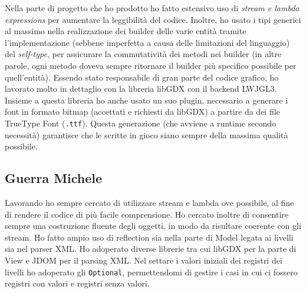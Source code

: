 Nella parte di progetto che ho prodotto ho fatto estensivo uso di \emph{stream
e lambda expressions} per aumentare la leggibilità del codice. Inoltre, ho
usato i tipi generici al massimo nella realizzazione dei builder delle varie
entità tramite l'implementazione (sebbene imperfetta a causa delle limitazioni
del linguaggio) del \emph{self-type}, per assicurare la commutatività dei
metodi nei builder (in altre parole, ogni metodo doveva sempre ritornare il
builder più specifico possibile per quell'entità). Essendo stato responsabile
di gran parte del codice grafico, ho lavorato molto in dettaglio con la
libreria libGDX con il backend LWJGL3. Insieme a questa libreria ho anche usato
un suo plugin, necessario a generare i font in formato bitmap (accettati e
richiesti da libGDX) a partire da dei file TrueType Font (\texttt{.ttf}).
Questa generazione (che avviene a runtime secondo necessità) garantisce che le
scritte in gioco siano sempre della massima qualità possibile.

\subsection{Guerra Michele}

Lavorando ho sempre cercato di utilizzare stream e lambda ove possibile, al
fine di rendere il codice di più facile comprensione. Ho cercato inoltre di
consentire sempre una costruzione fluente degli oggetti, in modo da risultare
coerente con gli stream. Ho fatto ampio uso di reflection sia nella parte di
Model legata ai livelli sia nel parser XML. Ho adoperato diverse librerie tra
cui libGDX per la parte di View e JDOM per il parsing XML. Nel settare i valori
iniziali dei registri dei livelli ho adoperato gli \texttt{Optional},
permettendomi di gestire i casi in cui ci fossero registri con valori e
registri senza valori.
